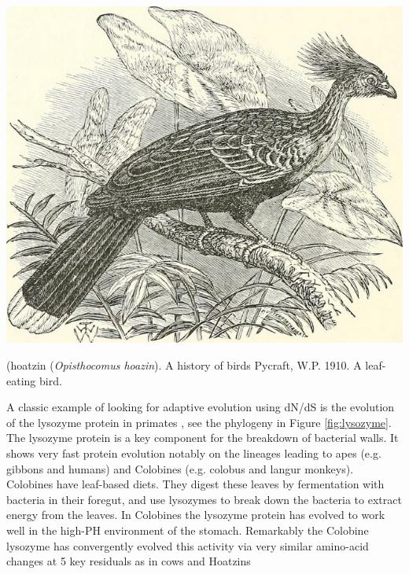 \begin{marginfigure}
\begin{center}
\includegraphics[width=0.8  \textwidth]{illustration_images/Genetic_drift/Hoatzin/14747388314_85798ba97e_z.jpg}
\end{center}
\caption{ (hoatzin ({\it Opisthocomus hoazin}). A history of birds
  Pycraft, W.P. 1910.  A leaf-eating bird.} \label{fig:hoatzin}  
\end{marginfigure} 
A classic example of looking for adaptive evolution using dN/dS is the
evolution of the lysozyme protein in primates \citep{Messier:97,Yang:98}, see
the phylogeny in Figure \ref{fig:lysozyme}. The lysozyme protein is
a key component for the breakdown of bacterial walls. It shows very
fast protein evolution notably on the lineages leading to apes (e.g. gibbons
and humans) and Colobines (e.g. colobus and langur monkeys). Colobines have leaf-based diets. They digest
these leaves by fermentation with bacteria in their foregut, and use lysozymes to break down the bacteria to extract energy from the
leaves. In Colobines the lysozyme protein has evolved to work well in the high-PH environment of the stomach. Remarkably the Colobine
lysozyme has convergently evolved this activity via very similar amino-acid changes at 5 key residuals as in cows and Hoatzins \citep[a leaf
eating bird,][]{kornegay1994molecular} 

